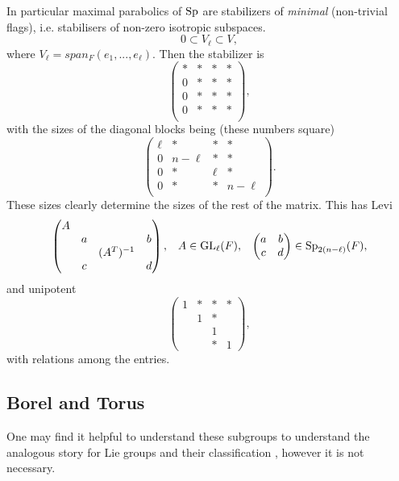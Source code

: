     \label{maximal_parabolic}
    In particular maximal parabolics of \(\operatorname{Sp}\) are stabilizers of \textit{minimal} (non-trivial flags), i.e. stabilisers of non-zero isotropic subspaces.
    \[0 \subset V_\ell \subset V,\]
    where \(V_\ell = span_F(e_1, ..., e_\ell)\). Then the stabilizer is 
    \[\begin{pmatrix}
        * &*&*&* \\
        0 &*&*&* \\
        0 &*&*&* \\
        0 &*&*&* \\
    \end{pmatrix},\]
    with the sizes of the diagonal blocks being (these numbers square)
    \[\begin{pmatrix}
        \ell &*&*&* \\
        0 &n-\ell&*&* \\
        0 &*&\ell&* \\
        0 &*&*&n-\ell \\
    \end{pmatrix}.\]
    These sizes clearly determine the sizes of the rest of the matrix. This has Levi
    \[\begin{pmatrix}
        A &&& \\
         &a&&b \\
         &&(A^T)^{-1}& \\
         &c&&d \\
    \end{pmatrix}, \;\;\; A\in \operatorname{GL}_\ell(F), \;\;\; \begin{pmatrix}
        a & b\\
        c & d \\
    \end{pmatrix} \in \operatorname{Sp}_{2(n-\ell)}(F),\]
    and unipotent 
    \[\begin{pmatrix}
        1 &*&*&* \\
        & 1&*& \\
        && 1& \\
        &&*&1
    \end{pmatrix},\]
    with relations among the entries.

    \subsection{Borel and Torus}\label{borel_torus}
    One may find it helpful to understand these subgroups to understand the analogous story for Lie groups and their classification \cite{hallLieGroupsLie2015}, however it is not necessary. 

